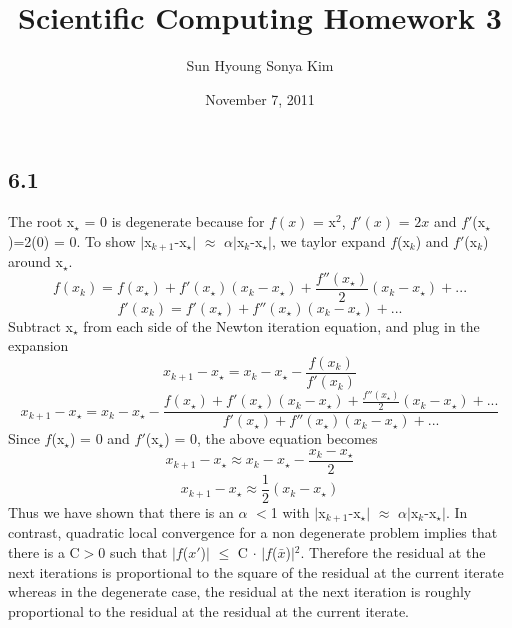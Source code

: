 \documentclass[11pt]{amsart}
\title{Scientific Computing Homework 3}
\author{Sun Hyoung Sonya Kim}
\date{November 7, 2011}                                           %
\begin{document}
\maketitle
\subsection*{6.1}

The root x$_{\star}$ = 0 is degenerate because for $f(x)$ = x$^{2}$, $f'(x)$ = $2x$ and $f'$(x$_{\star}$)=2(0) = 0. To show $|$x$_{k+1}$-x$_{\star}$$|$ $\approx$ $\alpha$$|$x$_{k}$-x$_{\star}$$|$, we taylor expand $f$(x$_{k}$) and $f'$(x$_{k}$) around x$_{\star}$. 
\[
f(x_{k}) = f(x_{\star})+f'(x_{\star})(x_{k}-x_{\star})+\frac{f''(x_{\star})}{2}(x_{k}-x_{\star})+ ...
\]
\[
f'(x_{k}) = f'(x_{\star})+f''(x_{\star})(x_{k}-x_{\star})+...
\]
\newline
Subtract x$_{\star}$ from each side of the Newton iteration equation, and plug in the expansion 
\[
x_{k+1}-x_{\star}=x_{k}-x_{\star}-\frac{f(x_{k})}{f'(x_{k})}
\]
\[
x_{k+1}-x_{\star} = x_{k}-x_{\star}-\frac{f(x_{\star})+f'(x_{\star})(x_{k}-x_{\star})+\frac{f''(x_{\star})}{2}(x_{k}-x_{\star})+ ...}{f'(x_{\star})+f''(x_{\star})(x_{k}-x_{\star})+...}
\]
\newline
Since $f$(x$_{\star}$) = 0 and $f'$(x$_{\star}$) = 0, the above equation becomes
\[
x_{k+1}-x_{\star} \approx x_{k}-x_{\star}-\frac{x_{k}-x_{\star}}{2}
\]
\[
x_{k+1}-x_{\star} \approx \frac{1}{2}(x_{k}-x_{\star})
\]
\newline
Thus we have shown that there is an $\alpha$ $<$1 with $|$x$_{k+1}$-x$_{\star}$$|$ $\approx$ $\alpha$$|$x$_{k}$-x$_{\star}$$|$.
\newline
\newline
In contrast, quadratic local convergence for a non degenerate problem implies that there is a C$>$0 such that $|$$f$($x$$'$)$|$ $\le$ C $\cdot$ $|$$f$($\bar{x}$)$|$$^{2}$. Therefore the residual at the next iterations is proportional to the square of the residual at the current iterate whereas in the degenerate case, the residual at the next iteration is roughly proportional to the residual at the residual at the current iterate. 
\end{document}
